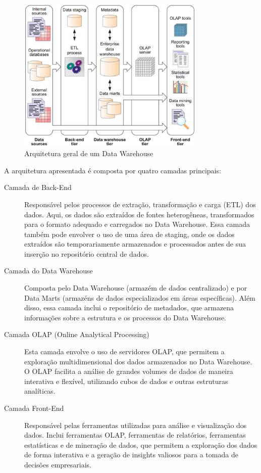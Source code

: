 \begin{figure}[h]
    \centering
    \includegraphics[width=0.8\textwidth]{figuras/typical_data_warehouse_architecture.eps}
    \caption{Arquitetura geral de um Data Warehouse \cite{vaisman2014data}}
    \label{fig:arquitetura_dw}
\end{figure} 

A arquitetura apresentada é composta por quatro camadas principais:
\begin{description}
    \item[Camada de Back-End] Responsável pelos processos de extração, transformação e carga (ETL) dos dados. Aqui, os dados são extraídos 
    de fontes heterogêneas, transformados para o formato adequado e carregados no Data Warehouse. Essa camada também pode envolver o uso de 
    uma área de staging, onde os dados extraídos são temporariamente armazenados e processados antes de sua inserção no repositório central 
    de dados.
    \item[Camada do Data Warehouse] Composta pelo Data Warehouse (armazém de dados centralizado) e por Data Marts (armazéns de dados 
    especializados em áreas específicas). Além disso, essa camada inclui o repositório de metadados, que armazena informações sobre 
    a estrutura e os processos do Data Warehouse.
    \item[Camada OLAP (Online Analytical Processing)] Esta camada envolve o uso de servidores OLAP, que permitem a exploração multidimensional 
    dos dados armazenados no Data Warehouse. O OLAP facilita a análise de grandes volumes de dados de maneira interativa e flexível, utilizando 
    cubos de dados e outras estruturas analíticas.
    \item[Camada Front-End] Responsável pelas ferramentas utilizadas para análise e visualização dos dados. Inclui ferramentas OLAP, ferramentas 
    de relatórios, ferramentas estatísticas e de mineração de dados, que permitem a exploração dos dados de forma interativa e a geração de 
    insights valiosos para a tomada de decisões empresariais.
\end{description}

